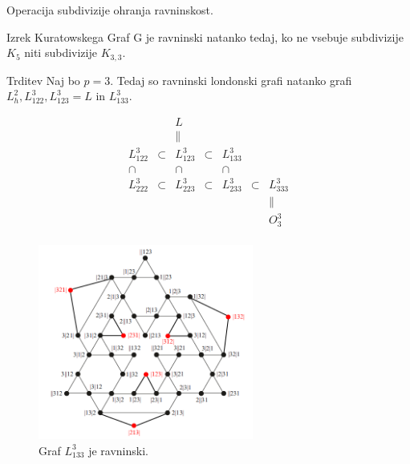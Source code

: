 \documentclass[dvipsnames]{beamer}
\begin{document}
\begin{frame}
    Operacija \alert{subdivizije} ohranja ravninskost.
    \begin{block}{Izrek Kuratowskega}
           	Graf G je ravninski natanko tedaj, ko ne vsebuje subdivizije $K_5$ niti subdivizije $K_{3,3}$.
    \end{block}

    \begin{block}{Trditev}
           	Naj bo $p=3$. Tedaj so ravninski londonski grafi natanko grafi $L_h^2, L_{122}^3,L_{123}^3 = L$ in $ L_{133}^3$.
    \end{block}
\end{frame}

\begin{frame}
    \begin{equation*}
    \label{eq:grafi-3krogle}
    \begin{matrix}
    & & L & & & & \\
    & & \parallel & & & & \\
    L_{122}^3 & \subset & L_{123}^3 & \subset & L_{133}^3 & & \\
    \cap & & \cap & & \cap & & \\
    L_{222}^3 & \subset & L_{223}^3 & \subset & L_{233}^3 & \subset & L_{333}^3 \\
    & & & & & & \parallel \\
    & & & & & & O^3_3 \\
    \end{matrix}
    \end{equation*}
\end{frame}

\begin{frame}
    \begin{figure}[h]
        \includegraphics[width=200pt]{../img/graph-L^3_133.png}
        \caption{Graf $L^3_{133}$ je ravninski.}
        \label{fig:L^3_133}
    \end{figure}
\end{frame}
\end{document}
